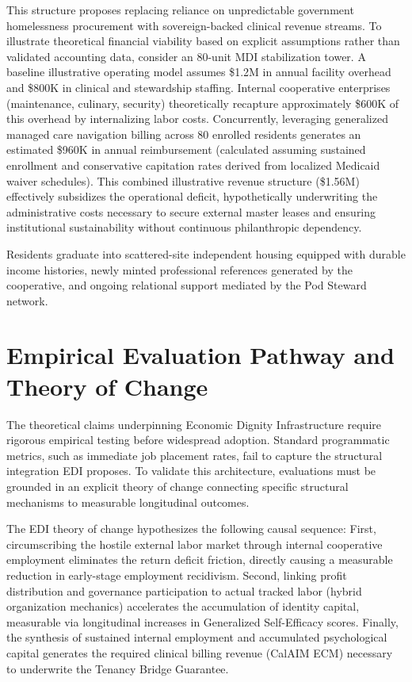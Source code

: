 \documentclass[12pt, letterpaper]{article}
\begin{document}
This structure proposes replacing reliance on unpredictable government homelessness procurement with sovereign-backed clinical revenue streams. To illustrate theoretical financial viability based on explicit assumptions rather than validated accounting data, consider an 80-unit MDI stabilization tower. A baseline illustrative operating model assumes \$1.2M in annual facility overhead and \$800K in clinical and stewardship staffing. Internal cooperative enterprises (maintenance, culinary, security) theoretically recapture approximately \$600K of this overhead by internalizing labor costs. Concurrently, leveraging generalized managed care navigation billing across 80 enrolled residents generates an estimated \$960K in annual reimbursement (calculated assuming sustained enrollment and conservative capitation rates derived from localized Medicaid waiver schedules). This combined illustrative revenue structure (\$1.56M) effectively subsidizes the operational deficit, hypothetically underwriting the administrative costs necessary to secure external master leases and ensuring institutional sustainability without continuous philanthropic dependency. 

Residents graduate into scattered-site independent housing equipped with durable income histories, newly minted professional references generated by the cooperative, and ongoing relational support mediated by the Pod Steward network.
\section{Empirical Evaluation Pathway and Theory of Change}

The theoretical claims underpinning Economic Dignity Infrastructure require rigorous empirical testing before widespread adoption. Standard programmatic metrics, such as immediate job placement rates, fail to capture the structural integration EDI proposes. To validate this architecture, evaluations must be grounded in an explicit theory of change connecting specific structural mechanisms to measurable longitudinal outcomes.

The EDI theory of change hypothesizes the following causal sequence: First, circumscribing the hostile external labor market through internal cooperative employment eliminates the return deficit friction, directly causing a measurable reduction in early-stage employment recidivism. Second, linking profit distribution and governance participation to actual tracked labor (hybrid organization mechanics) accelerates the accumulation of identity capital, measurable via longitudinal increases in Generalized Self-Efficacy scores. Finally, the synthesis of sustained internal employment and accumulated psychological capital generates the required clinical billing revenue (CalAIM ECM) necessary to underwrite the Tenancy Bridge Guarantee. 
\end{document}
